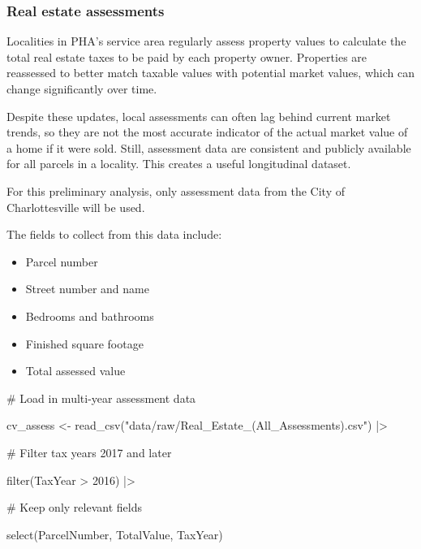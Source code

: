 \documentclass[
  letterpaper,
  DIV=11,
  numbers=noendperiod]{scrartcl}
\newenvironment{Shaded}{\begin{snugshade}}{\end{snugshade}}
\newcommand{\CommentTok}[1]{\textcolor[rgb]{0.37,0.37,0.37}{#1}}
\newcommand{\DecValTok}[1]{\textcolor[rgb]{0.68,0.00,0.00}{#1}}
\newcommand{\FunctionTok}[1]{\textcolor[rgb]{0.28,0.35,0.67}{#1}}
\newcommand{\NormalTok}[1]{\textcolor[rgb]{0.00,0.23,0.31}{#1}}
\newcommand{\OtherTok}[1]{\textcolor[rgb]{0.00,0.23,0.31}{#1}}
\newcommand{\SpecialCharTok}[1]{\textcolor[rgb]{0.37,0.37,0.37}{#1}}
\newcommand{\StringTok}[1]{\textcolor[rgb]{0.13,0.47,0.30}{#1}}
\providecommand{\tightlist}{%
  \setlength{\itemsep}{0pt}\setlength{\parskip}{0pt}}\usepackage{longtable,booktabs,array}
\begin{document}
\hypertarget{real-estate-assessments}{%
\subsubsection{Real estate assessments}\label{real-estate-assessments}}

Localities in PHA's service area regularly assess property values to
calculate the total real estate taxes to be paid by each property owner.
Properties are reassessed to better match taxable values with potential
market values, which can change significantly over time.

Despite these updates, local assessments can often lag behind current
market trends, so they are not the most accurate indicator of the actual
market value of a home if it were sold. Still, assessment data are
consistent and publicly available for all parcels in a locality. This
creates a useful longitudinal dataset.

For this preliminary analysis, only assessment data from the City of
Charlottesville will be used.

The fields to collect from this data include:

\begin{itemize}
\tightlist
\item
  Parcel number
\item
  Street number and name
\item
  Bedrooms and bathrooms
\item
  Finished square footage
\item
  Total assessed value
\end{itemize}

\begin{Shaded}
\begin{Highlighting}[]
\CommentTok{\# Load in multi{-}year assessment data}

\NormalTok{cv\_assess }\OtherTok{\textless{}{-}} \FunctionTok{read\_csv}\NormalTok{(}\StringTok{"data/raw/Real\_Estate\_(All\_Assessments).csv"}\NormalTok{) }\SpecialCharTok{|\textgreater{}} 
  
  \CommentTok{\# Filter tax years 2017 and later}
  
  \FunctionTok{filter}\NormalTok{(TaxYear }\SpecialCharTok{\textgreater{}} \DecValTok{2016}\NormalTok{) }\SpecialCharTok{|\textgreater{}} 
  
  \CommentTok{\# Keep only relevant fields}
  
  \FunctionTok{select}\NormalTok{(ParcelNumber, TotalValue, TaxYear)}
\end{Highlighting}
\end{Shaded}
\end{document}
